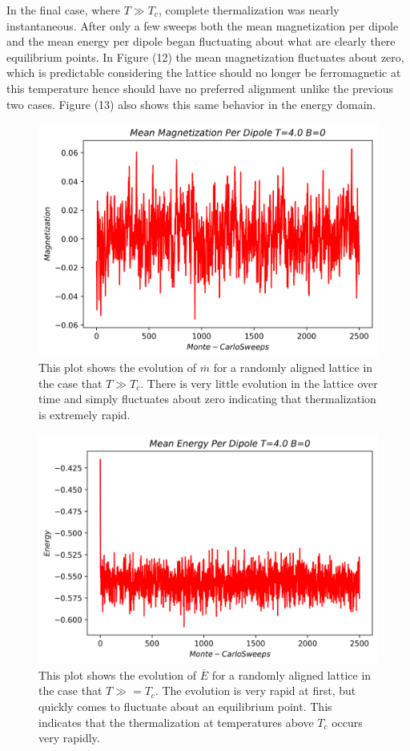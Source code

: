 \documentclass[twocolumn]{article}
\begin{document}
In the final case, where $T \gg T_c$, complete thermalization was nearly instantaneous. After only a few sweeps both the mean magnetization per dipole and the mean energy per dipole began fluctuating about what are clearly there equilibrium points. In Figure (12) the mean magnetization fluctuates about zero, which is predictable considering the lattice should no longer be ferromagnetic at this temperature hence should have no preferred alignment unlike the previous two cases. Figure (13) also shows this same behavior in the energy domain. \\
\begin{figure}[H]
\caption{This plot shows the evolution of $\overline{m}$ for a randomly aligned lattice in the case that $T\gg T_c$. There is very little evolution in the lattice over time and simply fluctuates about zero indicating that thermalization is extremely rapid.}
\centering
\includegraphics[scale=.5]{MagnetizationT=4B=0}
\end{figure}
\begin{figure}[ht]
\caption{This plot shows the evolution of $\overline{E}$ for a randomly aligned lattice in the case that $T\gg =T_c$. The evolution is very rapid at first, but quickly comes to fluctuate about an equilibrium point. This indicates that the thermalization at temperatures above $T_c$ occurs very rapidly.}
\centering
\includegraphics[scale=.5]{EnergyT=4B=0}
\end{figure}
\end{document}

